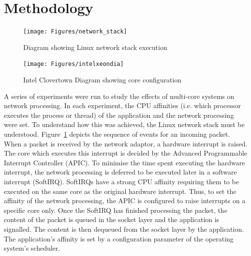 \documentclass[conference, compsoc]{IEEEtran}
\begin{document}


\section{Methodology}
\label{sect:setup}

\begin{figure}[tb]
    \begin{center}
        \texttt{[image: Figures/network\_stack]}
    \end{center}
    \caption{Diagram showing Linux network stack execution}
    \label{fig:network_stack}
\end{figure}

\begin{figure}[tb]
    \begin{center}
        \texttt{[image: Figures/intelxeondia]}
    \end{center}
    \caption{Intel Clovertown Diagram showing core configuration}
    \label{fig:xeon}
\end{figure}

A series of experiments were run to study the effects of multi-core systems on network processing. In each experiment, the CPU affinities (i.e. which processor executes the process or thread) of the application and the network processing were set. To understand how this was achieved, the Linux network stack must be understood. Figure~\ref{fig:network_stack} depicts the sequence of events for an incoming packet. When a packet is received by the network adaptor, a hardware interrupt is raised. The core which executes this interrupt is decided by the Advanced Programmable Interrupt Controller (APIC). To minimise the time spent executing the hardware interrupt, the network processing is deferred to be executed later in a software interrupt (SoftIRQ). SoftIRQs have a strong CPU affinity requiring them to be executed on the same core as the original hardware interrupt. Thus, to set the affinity of the network processing, the APIC is configured to raise interrupts on a specific core only. Once the SoftIRQ has finished processing the packet, the content of the packet is queued in the socket layer and the application is signalled. The content is then dequeued from the socket layer by the application. The application's affinity is set by a configuration parameter of the operating system's scheduler.
\end{document}
